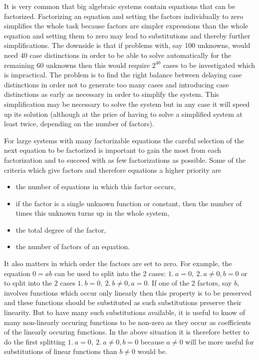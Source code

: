 It is very common that big algebraic systems contain equations that
can be factorized.  Factorizing an equation and setting the factors
individually to zero simplifies the whole task because factors are
simpler expressions than the whole equation and setting them to zero
may lead to substitutions and thereby further simplifications.  The
downside is that if problems with, say 100 unknowns, would need 40
case distinctions in order to be able to solve automatically for the
remaining 60 unknowns then this would require $2^{40}$ cases to be
investigated which is impractical.  The problem is to find the right
balance between delaying case distinctions in order not to generate
too many cases and introducing case distinctions as early as necessary
in order to simplify the system.  This simplification may be necessary
to solve the system but in any case it will speed up its solution
(although at the price of having to solve a simplified system at least
twice, depending on the number of factors).

For large systems with many factorizable equations the careful
selection of the next equation to be factorized is important to gain
the most from each factorization and to succeed with as few
factorizations as possible.  Some of the criteria which give factors
and therefore equations a higher priority are
\begin{itemize}
\item the number of equations in which this factor occurs,
\item if the factor is a single unknown function or constant, then the
  number of times this unknown turns up in the whole system,
\item the total degree of the factor,
\item the number of factors of an equation.
\end{itemize}
It also matters in which order the factors are set to zero.  For
example, the equation $0=ab$ can be used to split into the 2 cases:
$1.\ a=0, \ 2.\ a\neq 0, b=0$ or to split into the 2 cases $1.\ b=0,
\ 2.\ b\neq 0, a=0$.  If one of the 2 factors, say $b$, involves
functions which occur only linearly then this property is to be
preserved and these functions should be substituted as such
substitutions preserve their linearity.  But to have many such
substitutions available, it is useful to know of many non-linearly
occuring functions to be non-zero as they occur as coefficients of the
linearly occuring functions.  In the above situation it is therefore
better to do the first splitting $1.\ a=0, \ 2.\ a\neq 0, b=0$ because
$a\neq 0$ will be more useful for substitutions of linear functions
than $b\neq 0$ would be.

